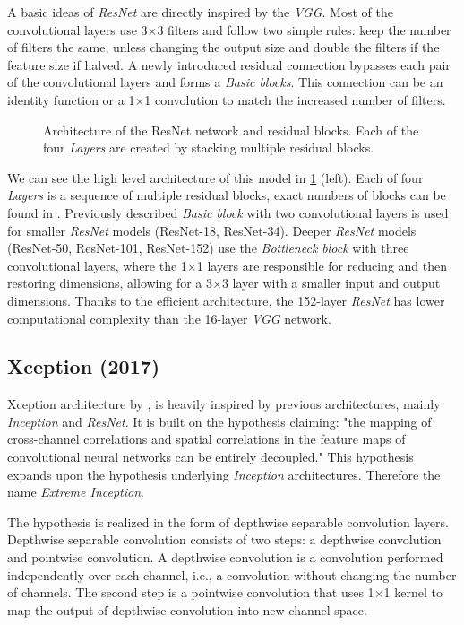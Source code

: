 A basic ideas of \textit{ResNet} are directly inspired by the \textit{VGG}. Most of the convolutional layers use 3$\times$3 filters and follow two simple rules: keep the number of filters the same, unless changing the output size and double the filters if the feature size if halved. A newly introduced residual connection bypasses each pair of the convolutional layers and forms a \textit{Basic blocks}. This connection can be an identity function or a 1$\times$1 convolution to match the increased number of filters.

\begin{figure}
    \resnetArch
    \caption{Architecture of the ResNet network and residual blocks. Each of the four \textit{Layers} are created by stacking multiple residual blocks.}
    \label{fig:resnet_arch}
\end{figure}

We can see the high level architecture of this model in \cref{fig:resnet_arch} (left). Each of four \textit{Layers} is a sequence of multiple residual blocks, exact numbers of blocks can be found in \cite[table 1]{bib:resnet}. Previously described \textit{Basic block} with two convolutional layers is used for smaller \textit{ResNet} models (ResNet-18, ResNet-34). Deeper \textit{ResNet} models (ResNet-50, ResNet-101, ResNet-152) use the \textit{Bottleneck block} with three convolutional layers, where the 1$\times$1 layers are responsible for reducing and then restoring dimensions, allowing for a 3$\times$3 layer with a smaller input and output dimensions. Thanks to the efficient architecture, the 152-layer \textit{ResNet} has lower computational complexity than the 16-layer \textit{VGG} network.



\subsection{Xception (2017)}
\label{sec:xception}
Xception architecture by \citeauthor{bib:xception} \cite{bib:xception}, is heavily inspired by previous architectures, mainly \textit{Inception} and \textit{ResNet}. It is built on the hypothesis claiming: "the mapping of cross-channel correlations and spatial correlations in the feature maps of convolutional neural networks can be entirely decoupled." This hypothesis expands upon the hypothesis underlying \textit{Inception} architectures. Therefore the name \textit{Extreme Inception}. 

The hypothesis is realized in the form of depthwise separable convolution layers. Depthwise separable convolution consists of two steps: a depthwise convolution and pointwise convolution. A depthwise convolution is a convolution performed independently over each channel, i.e., a convolution without changing the number of channels. The second step is a pointwise convolution that uses 1$\times$1 kernel to map the output of depthwise convolution into new channel space.

